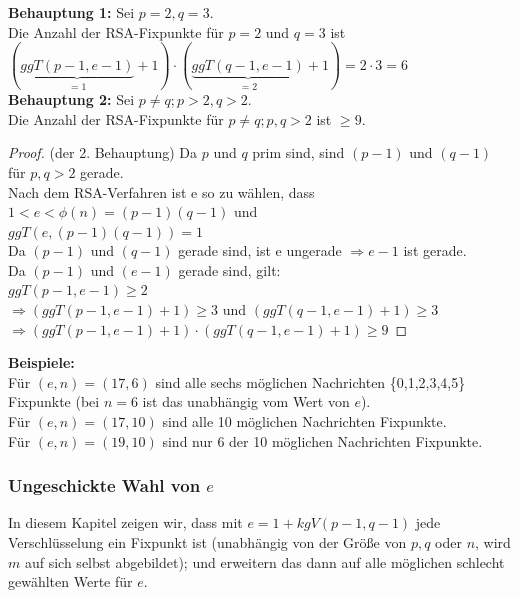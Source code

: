 \begin{refsegment}
\textbf{Behauptung 1:} Sei $p = 2, q = 3$.\\
Die Anzahl der RSA-Fixpunkte für $p=2$ und $q=3$ ist\\
$(\underbrace{ggT(p-1, e-1)}_{=1}+1) \cdot (\underbrace{ggT(q-1, e-1)}_{=2}+1)=2 \cdot 3=6$\\

\textbf{Behauptung 2:} Sei $p \neq q; p > 2,q > 2$.\\
Die Anzahl der RSA-Fixpunkte für $p \neq q; p,q > 2$ ist $\geq 9$.

\begin{proof}{(der 2. Behauptung)}
Da $p$ und $q$ prim sind, sind $(p-1)$ und $(q-1)$ für $ p,q > 2 $ gerade.\\
Nach dem RSA-Verfahren ist e so zu wählen, dass $1 < e < \phi(n)=(p-1)(q-1)$ und\\
$ggT(e,(p-1)(q-1))=1$\\
Da $(p-1)$ und $(q-1)$ gerade sind, ist e ungerade $ \Rightarrow e-1$ ist gerade.\\
Da $(p-1)$ und $(e-1)$ gerade sind, gilt:\\
$ggT(p-1, e-1) \geq 2$\\
$\Rightarrow (ggT(p-1, e-1)+1) \geq 3$ und $(ggT(q-1, e-1)+1) \geq 3$\\
$\Rightarrow (ggT(p-1, e-1)+1) \cdot (ggT(q-1, e-1)+1) \geq 9$
\end{proof}

\textbf{Beispiele:}\\
Für $(e,n)=(17,6)$ sind alle sechs möglichen Nachrichten \{0,1,2,3,4,5\} Fixpunkte (bei $n=6$ ist das unabhängig vom Wert von $e$).\\
Für $(e,n)=(17,10)$ sind alle 10 möglichen Nachrichten Fixpunkte.\\
Für $(e,n)=(19,10)$ sind nur 6 der 10 möglichen Nachrichten Fixpunkte.



\subsubsection{Ungeschickte Wahl von \texorpdfstring{$e$}{e}}%

In diesem Kapitel zeigen wir, dass mit $e=1+kgV(p-1,q-1)$ jede Verschlüsselung ein
Fixpunkt ist (unabhängig von der Größe von $p, q$ oder $n$, wird $m$ auf sich selbst abgebildet);
und erweitern das dann auf alle möglichen schlecht gewählten Werte für $e$.


\end{refsegment}
